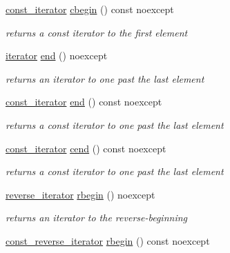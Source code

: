 \begin{DoxyCompactItemize}
\mbox{\hyperlink{classnlohmann_1_1basic__json_a41a70cf9993951836d129bb1c2b3126a}{const\+\_\+iterator}} \mbox{\hyperlink{classnlohmann_1_1basic__json_ad865d6c291b237ae508d5cb2146b5877}{cbegin}} () const noexcept
\begin{DoxyCompactList}\small\item\em returns a const iterator to the first element \end{DoxyCompactList}\item 
\mbox{\hyperlink{classnlohmann_1_1basic__json_a099316232c76c034030a38faa6e34dca}{iterator}} \mbox{\hyperlink{classnlohmann_1_1basic__json_a13e032a02a7fd8a93fdddc2fcbc4763c}{end}} () noexcept
\begin{DoxyCompactList}\small\item\em returns an iterator to one past the last element \end{DoxyCompactList}\item 
\mbox{\hyperlink{classnlohmann_1_1basic__json_a41a70cf9993951836d129bb1c2b3126a}{const\+\_\+iterator}} \mbox{\hyperlink{classnlohmann_1_1basic__json_a1c15707055088cd5436ae91db72cbe67}{end}} () const noexcept
\begin{DoxyCompactList}\small\item\em returns a const iterator to one past the last element \end{DoxyCompactList}\item 
\mbox{\hyperlink{classnlohmann_1_1basic__json_a41a70cf9993951836d129bb1c2b3126a}{const\+\_\+iterator}} \mbox{\hyperlink{classnlohmann_1_1basic__json_a8dba7b7d2f38e6b0c614030aa43983f6}{cend}} () const noexcept
\begin{DoxyCompactList}\small\item\em returns a const iterator to one past the last element \end{DoxyCompactList}\item 
\mbox{\hyperlink{classnlohmann_1_1basic__json_ac223d5560c2b05a208c88de67376c5f2}{reverse\+\_\+iterator}} \mbox{\hyperlink{classnlohmann_1_1basic__json_a1ef93e2006dbe52667294f5ef38b0b10}{rbegin}} () noexcept
\begin{DoxyCompactList}\small\item\em returns an iterator to the reverse-\/beginning \end{DoxyCompactList}\item 
\mbox{\hyperlink{classnlohmann_1_1basic__json_a72be3c24bfa24f0993d6c11af03e7404}{const\+\_\+reverse\+\_\+iterator}} \mbox{\hyperlink{classnlohmann_1_1basic__json_a515e7618392317dbf4b72d3e18bf2ab2}{rbegin}} () const noexcept

\end{DoxyCompactItemize}
